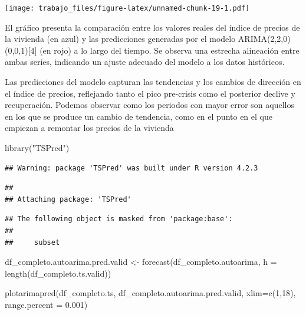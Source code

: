 \documentclass[
]{article}
\newenvironment{Shaded}{\begin{snugshade}}{\end{snugshade}}
\newcommand{\AttributeTok}[1]{\textcolor[rgb]{0.77,0.63,0.00}{#1}}
\newcommand{\DecValTok}[1]{\textcolor[rgb]{0.00,0.00,0.81}{#1}}
\newcommand{\FloatTok}[1]{\textcolor[rgb]{0.00,0.00,0.81}{#1}}
\newcommand{\FunctionTok}[1]{\textcolor[rgb]{0.00,0.00,0.00}{#1}}
\newcommand{\NormalTok}[1]{#1}
\newcommand{\OtherTok}[1]{\textcolor[rgb]{0.56,0.35,0.01}{#1}}
\newcommand{\SpecialCharTok}[1]{\textcolor[rgb]{0.00,0.00,0.00}{#1}}
\newcommand{\StringTok}[1]{\textcolor[rgb]{0.31,0.60,0.02}{#1}}
\begin{document}
\begin{Shaded}
\end{Shaded}

\texttt{[image: trabajo\_files/figure-latex/unnamed-chunk-19-1.pdf]}

El gráfico presenta la comparación entre los valores reales del índice
de precios de la vivienda (en azul) y las predicciones generadas por el
modelo ARIMA(2,2,0)(0,0,1){[}4{]} (en rojo) a lo largo del tiempo. Se
observa una estrecha alineación entre ambas series, indicando un ajuste
adecuado del modelo a los datos históricos.

Las predicciones del modelo capturan las tendencias y los cambios de
dirección en el índice de precios, reflejando tanto el pico pre-crisis
como el posterior declive y recuperación. Podemos observar como los
periodos con mayor error son aquellos en los que se produce un cambio de
tendencia, como en el punto en el que empiezan a remontar los precios de
la vivienda

\begin{Shaded}
\begin{Highlighting}[]
\FunctionTok{library}\NormalTok{(}\StringTok{"TSPred"}\NormalTok{)}
\end{Highlighting}
\end{Shaded}

\begin{verbatim}
## Warning: package 'TSPred' was built under R version 4.2.3
\end{verbatim}

\begin{verbatim}
## 
## Attaching package: 'TSPred'
\end{verbatim}

\begin{verbatim}
## The following object is masked from 'package:base':
## 
##     subset
\end{verbatim}

\begin{Shaded}
\begin{Highlighting}[]
\NormalTok{df\_completo.autoarima.pred.valid }\OtherTok{\textless{}{-}} \FunctionTok{forecast}\NormalTok{(df\_completo.autoarima, }\AttributeTok{h =} \FunctionTok{length}\NormalTok{(df\_completo.ts.valid))}

\FunctionTok{plotarimapred}\NormalTok{(df\_completo.ts, df\_completo.autoarima.pred.valid, }\AttributeTok{xlim=}\FunctionTok{c}\NormalTok{(}\DecValTok{1}\NormalTok{,}\DecValTok{18}\NormalTok{), }\AttributeTok{range.percent =} \FloatTok{0.001}\NormalTok{)}
\end{Highlighting}
\end{Shaded}
\end{document}
